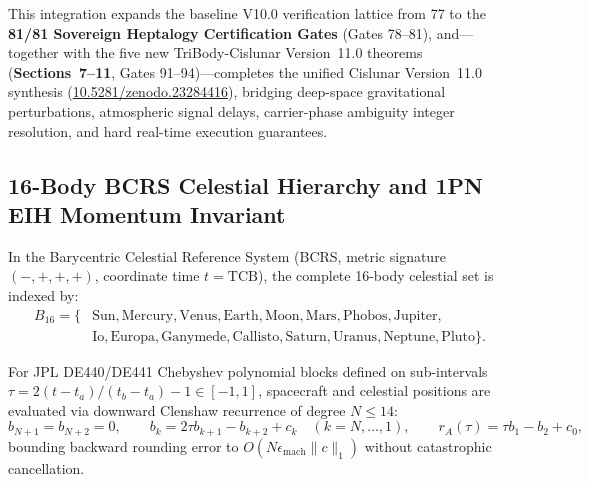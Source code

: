 \documentclass[11pt,a4paper,reqno]{article}
\def\bm#1{#1}%
\def\texttt#1{#1}%
\def\mathcal#1{#1}%
\newcommand{\zenodo}[1]{\href{https://doi.org/10.5281/zenodo.#1}{\texttt{10.5281/\allowbreak zenodo.#1}}}
\theoremstyle{plain}
\theoremstyle{definition}
\theoremstyle{remark}
\numberwithin{equation}{section}
\begin{document}
This integration expands the baseline V10.0 verification lattice from 77 to the \textbf{81/81 Sovereign Heptalogy Certification Gates} (\texttt{Gates 78--81}), and—together with the five new TriBody-Cislunar Version~11.0 theorems (\textbf{Sections~7--11}, \texttt{Gates 91--94})—completes the unified Cislunar Version~11.0 synthesis (\zenodo{23284416}), bridging deep-space gravitational perturbations, atmospheric signal delays, carrier-phase ambiguity integer resolution, and hard real-time execution guarantees.

\subsection{16-Body BCRS Celestial Hierarchy and 1PN EIH Momentum Invariant}
In the Barycentric Celestial Reference System (BCRS, metric signature $(-,+,+,+)$, coordinate time $t = \text{TCB}$), the complete 16-body celestial set is indexed by:
\begin{equation}
\begin{aligned}
  \mathcal{B}_{16} = \big\{ &\text{Sun}, \text{Mercury}, \text{Venus}, \text{Earth}, \text{Moon}, \text{Mars}, \text{Phobos}, \text{Jupiter}, \\
  &\text{Io}, \text{Europa}, \text{Ganymede}, \text{Callisto}, \text{Saturn}, \text{Uranus}, \text{Neptune}, \text{Pluto} \big\}.
\end{aligned}
  \label{eq:bcrs_16body_set}
\end{equation}

For JPL DE440/DE441 Chebyshev polynomial blocks defined on sub-intervals $\tau = 2(t - t_a)/(t_b - t_a) - 1 \in [-1, 1]$, spacecraft and celestial positions are evaluated via downward Clenshaw recurrence of degree $N \le 14$:
\begin{equation}
  \bm{b}_{N+1} = \bm{b}_{N+2} = \bm{0}, \qquad \bm{b}_k = 2\tau\bm{b}_{k+1} - \bm{b}_{k+2} + \bm{c}_k \quad (k = N, \dots, 1), \qquad \bm{r}_A(\tau) = \tau\bm{b}_1 - \bm{b}_2 + \bm{c}_0,
  \label{eq:clenshaw_chebyshev_v11}
\end{equation}
bounding backward rounding error to $\mathcal{O}(N\epsilon_{\text{mach}}\|\bm{c}\|_1)$ without catastrophic cancellation.
\end{document}
